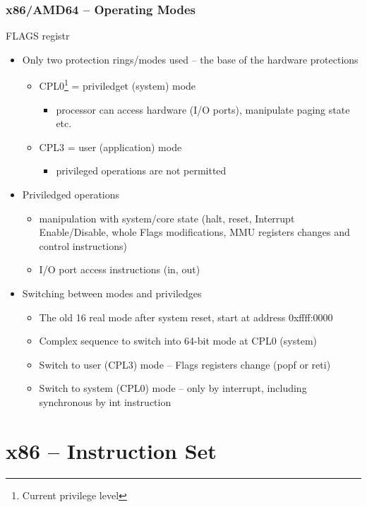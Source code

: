 \documentclass{beamer}
\begin{document}
\begin{frame}
\frametitle{x86/AMD64 -- Operating Modes}
FLAGS registr 
\begin{itemize}
  \item Only two protection rings/modes used -- the base of the hardware protections
  \begin{itemize}
    \item CPL0\footnote{Current privilege level} = priviledget (system) mode
    \begin{itemize}
      \item processor can access hardware (I/O ports), manipulate paging state etc. 
    \end{itemize}
    \item CPL3 = user (application) mode
    \begin{itemize}
      \item privileged operations are not permitted
    \end{itemize}
  \end{itemize}
  \item Priviledged operations
  \begin{itemize}
    \item manipulation with system/core state (halt, reset, Interrupt Enable/Disable, whole Flags modifications, MMU registers changes and control instructions) 
    \item I/O port access instructions (in, out)
  \end{itemize}

  \item Switching between modes and priviledges
  \begin{itemize}
    \item The old 16 real mode after system reset, start at address 0xffff:0000
    \item Complex sequence to switch into 64-bit mode at CPL0 (system)
    \item Switch to user (CPL3) mode – Flags registers change (popf or reti)
    \item Switch to system (CPL0) mode – only by interrupt, including synchronous by int instruction
  \end{itemize}
\end{itemize}
\end{frame}


\section{x86 -- Instruction Set}
\end{document}
